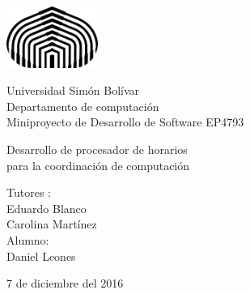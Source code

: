 \documentclass[]{article}
\begin{document}


\begin{titlepage}

\setlength{\hoffset}{-0.3in}
\setlength{\voffset}{-1in}
\setlength{\topmargin}{1.5cm}
\setlength{\headheight}{0.5cm}
\setlength{\headsep}{1cm}
\setlength{\oddsidemargin}{3cm}
\setlength{\evensidemargin}{3cm}
\setlength{\footskip}{1.5cm}
\enlargethispage{1cm}

\fontsize{12pt}{14pt}
\selectfont

\begin{center}

\includegraphics[height=2cm]{logo.png}

\vspace{0.5cm}

Universidad Sim\'on Bol\'ivar\\
Departamento de computaci\'on\\
Miniproyecto de Desarrollo de Software EP4793\\

\vspace{3.5cm}

\fontsize{17.28pt}{21pt}
\selectfont

Desarrollo de procesador de horarios \\
para la coordinación de computación\\


\fontsize{12pt}{14pt}
\selectfont

\vspace{.6cm}



\vspace{.4cm}


\vspace{3cm}

Tutores : \\
Eduardo Blanco\\
Carolina Mart\'inez\\
\vspace{1cm}
Alumno: \\
Daniel  Leones \\


\vspace{1cm}

7 de diciembre del 2016

\end{center}
\end{titlepage}
\end{document}
